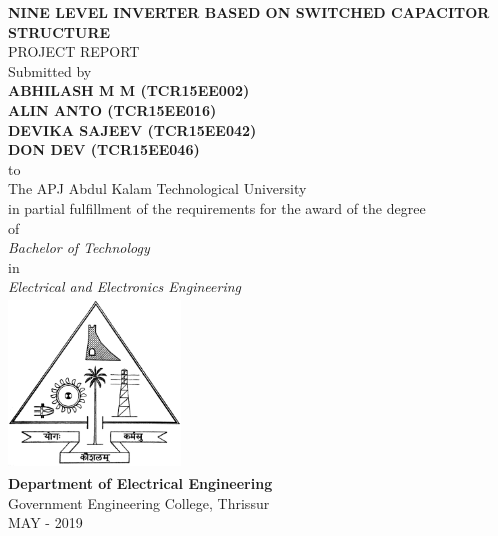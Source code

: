 \documentclass[12pt,a4paper]{report}
\begin{document}
	\begin{titlepage}
		\begin{center}
			{\bf\LARGE{NINE LEVEL INVERTER BASED ON SWITCHED CAPACITOR STRUCTURE}}\vspace{0.4in}\\
			{\Large{PROJECT REPORT}}\vspace{0.1in}\\
			{\large{Submitted by}}\vspace{0.4in}\\	
			{\bf\large ABHILASH M M (TCR15EE002)} \\
			{\bf\large ALIN ANTO (TCR15EE016)} \\
			{\bf\large DEVIKA SAJEEV (TCR15EE042)} \\
			{\bf\large DON DEV (TCR15EE046)}\vspace{0.2in}\\
			to\vspace{0.2in}\\
			The APJ Abdul Kalam Technological University\\
			in partial fulfillment of the requirements for the award of the degree\vspace{0.2in}\\
			of\vspace{0.2in}\\
			{\textit{Bachelor of Technology}}\\
			in\\
			{\textit{Electrical and Electronics Engineering}}\vspace{0.2in}\\
			\includegraphics[height=1.8in, width=1.8in]{figures/gect.jpg}\\
			{\bf{Department of Electrical Engineering}} \\
			Government Engineering College, Thrissur  \\
			MAY - 2019\\
		\end{center}
	\end{titlepage}
	
\end{document}
